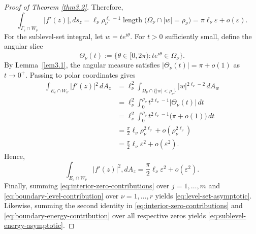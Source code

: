 \documentclass[12pt,twoside]{amsart}
\numberwithin{equation}{section}
\numberwithin{definition}{section} %
\begin{document}
\begin{proof}[Proof of Theorem \ref{thm3.2}]
Therefore,
\begin{equation}\label{eq:boundary-level-contribution}
\int_{\Gamma_\varepsilon \cap W_\nu} |f'(z)|,ds_z = \ell_\nu \rho_\nu^{\ell_\nu - 1} \operatorname{length}\bigl(\Omega_\nu \cap {|w| = \rho_\nu}\bigr) = \pi \ell_\nu \varepsilon + o(\varepsilon).
\end{equation}
For the sublevel-set integral, let $w = t e^{i\theta}$. For $t > 0$ sufficiently small, define the angular slice
$$
\Theta_\nu(t) := \bigl\{\theta \in [0, 2\pi) : t e^{i\theta} \in \Omega_\nu\bigr\}.
$$
By Lemma~\ref{lem3.1}, the angular measure satisfies $\vert{}\Theta_\nu(t)\vert{} = \pi + o(1)$ as $t \to 0^+$. Passing to polar coordinates gives
$$  
\begin{aligned} 
\int_{E_\varepsilon \cap W_\nu} \vert{}f'(z)\vert{}^2\,dA_z &= \ell_\nu^2 \int_{\Omega_\nu \cap \{\vert{}w\vert{} < \rho_\nu\}} \vert{}w\vert{}^{2\ell_\nu - 2}\,dA_w \\ &= \ell_\nu^2 \int_0^{\rho_\nu} t^{2\ell_\nu - 1} \vert{}\Theta_\nu(t)\vert{}\,dt \\ &= \ell_\nu^2 \int_0^{\rho_\nu} t^{2\ell_\nu - 1} \bigl(\pi + o(1)\bigr)\,dt \\ &= \frac{\pi}{2} \ell_\nu \rho_\nu^{2\ell_\nu} + o(\rho_\nu^{2\ell_\nu}) \\ &= \frac{\pi}{2}\ell_\nu \varepsilon^2 + o(\varepsilon^2). 
\end{aligned}
$$
Hence,
\begin{equation}\label{eq:boundary-energy-contribution}
\int_{E_\varepsilon \cap W_\nu} |f'(z)|^2,dA_z = \frac{\pi}{2} \ell_\nu \varepsilon^2 + o(\varepsilon^2).
\end{equation}
\medskip
Finally, summing \eqref{eq:interior-zero-contributions} over $j = 1, \dots, m$ and \eqref{eq:boundary-level-contribution} over $\nu = 1, \dots, r$ yields \eqref{eq:level-set-asymptotic}. Likewise, summing the second identity in \eqref{eq:interior-zero-contributions} and \eqref{eq:boundary-energy-contribution} over all respective zeros yields \eqref{eq:sublevel-energy-asymptotic}.

\end{proof}
\end{document}
